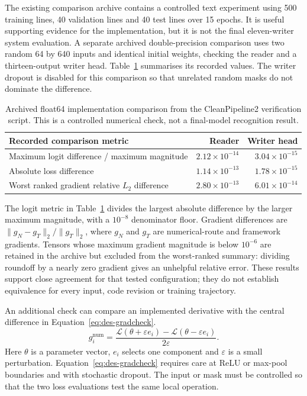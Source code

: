The existing comparison archive contains a controlled text experiment using 500 training lines, 40 validation lines and 40 test lines over 15 epochs. It is useful supporting evidence for the implementation, but it is not the final eleven-writer system evaluation. A separate archived double-precision comparison uses two random 64 by 640 inputs and identical initial weights, checking the reader and a thirteen-output writer head. Table~\ref{tab:des-numericalcheck} summarises its recorded values. The writer dropout is disabled for this comparison so that unrelated random masks do not dominate the difference.
\begin{table}[H]\centering\small
\begin{tabularx}{\linewidth}{|X|r|r|}
\hline\textbf{Recorded comparison metric}&\textbf{Reader}&\textbf{Writer head}\\\hline
Maximum logit difference / maximum magnitude&$2.12\times10^{-14}$&$3.04\times10^{-15}$\\\hline
Absolute loss difference&$1.14\times10^{-13}$&$1.78\times10^{-15}$\\\hline
Worst ranked gradient relative $L_2$ difference&$2.80\times10^{-13}$&$6.01\times10^{-14}$\\\hline
\end{tabularx}
\caption{Archived float64 implementation comparison from the CleanPipeline2 verification script. This is a controlled numerical check, not a final-model recognition result.}
\label{tab:des-numericalcheck}
\end{table}
The logit metric in Table~\ref{tab:des-numericalcheck} divides the largest absolute difference by the larger maximum magnitude, with a $10^{-8}$ denominator floor. Gradient differences are $\|g_N-g_T\|_2/\|g_T\|_2$, where $g_N$ and $g_T$ are numerical-route and framework gradients. Tensors whose maximum gradient magnitude is below $10^{-6}$ are retained in the archive but excluded from the worst-ranked summary: dividing roundoff by a nearly zero gradient gives an unhelpful relative error. These results support close agreement for that tested configuration; they do not establish equivalence for every input, code revision or training trajectory.

An additional check can compare an implemented derivative with the central difference in Equation~\ref{eq:des-gradcheck}.
\begin{equation}
g_i^{\mathrm{num}}=\frac{\mathcal L(\theta+\varepsilon e_i)
-\mathcal L(\theta-\varepsilon e_i)}{2\varepsilon}.
\label{eq:des-gradcheck}
\end{equation}
Here $\theta$ is a parameter vector, $e_i$ selects one component and $\varepsilon$ is a small perturbation. Equation~\ref{eq:des-gradcheck} requires care at ReLU or max-pool boundaries and with stochastic dropout. The input or mask must be controlled so that the two loss evaluations test the same local operation.

